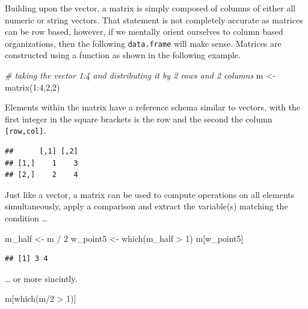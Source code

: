 \documentclass[
]{book}
\newenvironment{Shaded}{\begin{snugshade}}{\end{snugshade}}
\newcommand{\CommentTok}[1]{\textcolor[rgb]{0.56,0.35,0.01}{\textit{#1}}}
\newcommand{\DecValTok}[1]{\textcolor[rgb]{0.00,0.00,0.81}{#1}}
\newcommand{\FunctionTok}[1]{\textcolor[rgb]{0.00,0.00,0.00}{#1}}
\newcommand{\NormalTok}[1]{#1}
\newcommand{\OtherTok}[1]{\textcolor[rgb]{0.56,0.35,0.01}{#1}}
\newcommand{\SpecialCharTok}[1]{\textcolor[rgb]{0.00,0.00,0.00}{#1}}
\begin{document}
Building upon the vector, a matrix is simply composed of columns of either all numeric or string vectors. That statement is not completely accurate as matrices can be row based, however, if we mentally orient ourselves to column based organizations, then the following \texttt{data.frame} will make sense. Matrices are constructed using a function as shown in the following example.

\begin{Shaded}
\begin{Highlighting}[]
\CommentTok{\# taking the vector 1:4 and distributing it by 2 rows and 2 columns}
\NormalTok{m }\OtherTok{\textless{}{-}} \FunctionTok{matrix}\NormalTok{(}\DecValTok{1}\SpecialCharTok{:}\DecValTok{4}\NormalTok{,}\DecValTok{2}\NormalTok{,}\DecValTok{2}\NormalTok{)}
\end{Highlighting}
\end{Shaded}

Elements within the matrix have a reference schema similar to vectors, with the first integer in the square brackets is the row and the second the column \texttt{{[}row,col{]}}.

\begin{verbatim}
##      [,1] [,2]
## [1,]    1    3
## [2,]    2    4
\end{verbatim}

Just like a vector, a matrix can be used to compute operations on all elements simultaneously, apply a comparison and extract the variable(s) matching the condition \ldots{}

\begin{Shaded}
\begin{Highlighting}[]
\NormalTok{m\_half }\OtherTok{\textless{}{-}}\NormalTok{ m }\SpecialCharTok{/} \DecValTok{2}
\NormalTok{w\_point5 }\OtherTok{\textless{}{-}} \FunctionTok{which}\NormalTok{(m\_half }\SpecialCharTok{\textgreater{}} \DecValTok{1}\NormalTok{)}
\NormalTok{m[w\_point5]}
\end{Highlighting}
\end{Shaded}

\begin{verbatim}
## [1] 3 4
\end{verbatim}

\ldots{} or more sincintly.

\begin{Shaded}
\begin{Highlighting}[]
\NormalTok{m[}\FunctionTok{which}\NormalTok{(m}\SpecialCharTok{/}\DecValTok{2} \SpecialCharTok{\textgreater{}} \DecValTok{1}\NormalTok{)]}
\end{Highlighting}
\end{Shaded}
\end{document}
